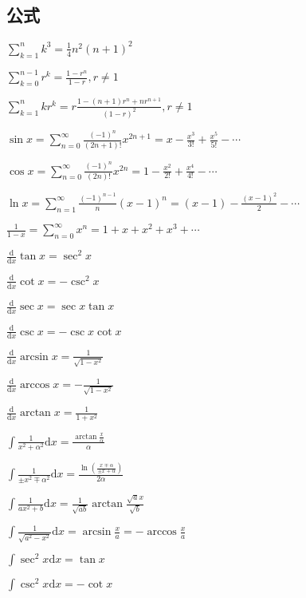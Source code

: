 \documentclass[9pt,landscape]{article}
\begin{document}
\begin{multicols}{3}

\columnseprule=0.25pt

\section{公式}

$\sum_{k=1}^{n}k^3=\frac{1}{4}n^2(n+1)^2$

$\sum_{k=0}^{n-1}r^k=\frac{1-r^n}{1-r}, r\neq 1$

$\sum_{k=1}^{n}kr^k=r\frac{1-(n+1)r^n+nr^{n+1}}{(1-r)^2}, r\neq 1$

$\sin x = \sum_{n=0}^{\infty} \frac{(-1)^n}{(2n+1)!}x^{2n+1} = x - \frac{x^3}{3!} + \frac{x^5}{5!} - \cdots$

$\cos x = \sum_{n=0}^{\infty} \frac{(-1)^n}{(2n)!}x^{2n} = 1 - \frac{x^2}{2!} + \frac{x^4}{4!} - \cdots$

$\ln x = \sum_{n=1}^{\infty} \frac{(-1)^{n-1}}{n}(x-1)^n = (x-1) - \frac{(x-1)^2}{2} - \cdots$

$\frac{1}{1-x} = \sum_{n=0}^{\infty} x^n = 1 + x + x^2 + x^3 + \cdots$

$\frac{\mathrm{d}}{\mathrm{d}x}\tan x=\sec ^{2}x$

$\frac{\mathrm{d}}{\mathrm{d}x}\cot x=-\csc ^{2}x$

$\frac{\mathrm{d}}{\mathrm{d}x}\sec x=\sec x\tan x$

$\frac{\mathrm{d}}{\mathrm{d}x}\csc x=-\csc x\cot x$

$\frac{\mathrm{d}}{\mathrm{d}x}\arcsin x={\frac {1}{\sqrt {1-x^{2}}}}$

$\frac{\mathrm{d}}{\mathrm{d}x}\arccos x=-{\frac {1}{\sqrt {1-x^{2}}}}$

$\frac{\mathrm{d}}{\mathrm{d}x}\arctan x={\frac {1}{1+x^{2}}}$

$ \int {\frac {1}{x^{2}+\alpha ^{2}}}{\mbox{d}}x={\frac {\arctan {\frac {x}{\alpha }}}{\alpha }} $

$ \int {\frac {1}{\pm x^{2}\mp \alpha ^{2}}}{\mbox{d}}x={\frac {\ln \left({\frac {x\mp \alpha }{\pm x+\alpha }}\right)}{2\alpha }} $

$ \int {\frac {1}{ax^{2}+b}}{\mbox{d}}x={\frac {1}{\sqrt {ab}}}\arctan {\frac {{\sqrt {a}}x}{\sqrt {b}}} $

$ \int {\frac {1}{\sqrt {a^{2}-x^{2}}}}{\mbox{d}}x=\arcsin {\frac {x}{a}}=-\arccos {\frac {x}{a}} $

$ \int \sec ^{2}x{\mbox{d}}x=\tan x $

$ \int \csc ^{2}x{\mbox{d}}x=-\cot x $


\end{multicols}
\end{document}
